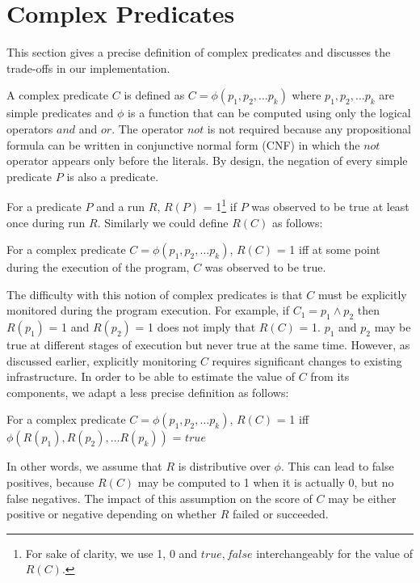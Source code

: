 \section{Complex Predicates}
\label{sec-complex-preds}
This section gives a precise definition of complex predicates and discusses the trade-offs in our implementation.

A complex predicate $C$ is defined as $C = \phi(p_1, p_2, \ldots p_k)$ where $p_1, p_2, \ldots p_k$ are simple predicates and $\phi$ is a function that can be computed using only the logical operators $and$ and $or$.  The operator $not$ is not required because any propositional formula can be written in conjunctive normal form (CNF) in which the $not$ operator appears only before the literals.  By design, the negation of every simple predicate $P$ is also a predicate.

For a predicate $P$ and a run $R$, $R(P)$ = 1{\footnote{For sake of clarity, we use 1, 0 and $true, false$ interchangeably for the value of $R(C)$.}} if $P$ was observed to be true at least once during run $R$.  Similarly we could define $R(C)$ as follows:
\begin{defn}
\label{dfn1}
For a complex predicate $C = \phi(p_1, p_2, \ldots p_k)$, $R(C)$ = 1 iff at some point during the execution of the program, $C$ was observed to be true.
\end{defn}

The difficulty with this notion of complex predicates is that $C$ must be explicitly monitored during the program execution.  For example, if $C_1 = p_1 \wedge p_2$ then $R(p_1)$ = 1 and $R(p_2)$ = 1 does not imply that $R(C)$ = 1.  $p_1$ and $p_2$ may be true at different stages of execution but never true at the same time.  However, as discussed earlier, explicitly monitoring $C$ requires significant changes to existing infrastructure.  In order to be able to estimate the value of $C$ from its components, we adapt a less precise definition as follows:
\begin{defn}
\label{dfn2}
For a complex predicate $C = \phi(p_1, p_2, \ldots p_k)$, $R(C)$ = 1 iff $\phi(R(p_1), R(p_2), \ldots R(p_k))$ = $true$
\end{defn}

In other words, we assume that $R$ is distributive over $\phi$.  This can lead to false positives, because $R(C)$ may be computed to 1 when it is actually 0, but no false negatives.  The impact of this assumption on the score of $C$ may be either positive or negative depending on whether $R$ failed or succeeded.


